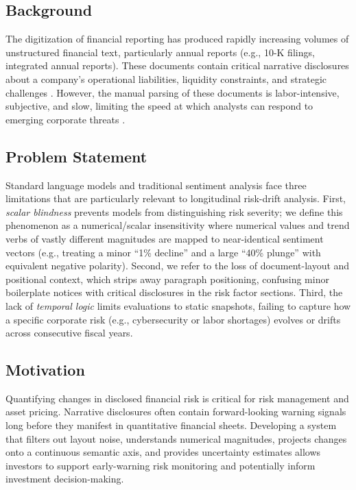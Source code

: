 \documentclass[journal]{IEEEtran}
\begin{document}
\subsection{Background}
The digitization of financial reporting has produced rapidly increasing volumes of unstructured financial text, particularly annual reports (e.g., 10-K filings, integrated annual reports). These documents contain critical narrative disclosures about a company's operational liabilities, liquidity constraints, and strategic challenges \cite{campbell2014, kravet2013, linsley2006}. However, the manual parsing of these documents is labor-intensive, subjective, and slow, limiting the speed at which analysts can respond to emerging corporate threats \cite{blei2003, fisher2016}.

\subsection{Problem Statement}
Standard language models and traditional sentiment analysis face three limitations that are particularly relevant to longitudinal risk-drift analysis. First, \textit{scalar blindness} prevents models from distinguishing risk severity; we define this phenomenon as a numerical/scalar insensitivity where numerical values and trend verbs of vastly different magnitudes are mapped to near-identical sentiment vectors (e.g., treating a minor ``1\% decline'' and a large ``40\% plunge'' with equivalent negative polarity). Second, we refer to the loss of document-layout and positional context, which strips away paragraph positioning, confusing minor boilerplate notices with critical disclosures in the risk factor sections. Third, the lack of \textit{temporal logic} limits evaluations to static snapshots, failing to capture how a specific corporate risk (e.g., cybersecurity or labor shortages) evolves or drifts across consecutive fiscal years.

\subsection{Motivation}
Quantifying changes in disclosed financial risk is critical for risk management and asset pricing. Narrative disclosures often contain forward-looking warning signals long before they manifest in quantitative financial sheets. Developing a system that filters out layout noise, understands numerical magnitudes, projects changes onto a continuous semantic axis, and provides uncertainty estimates allows investors to support early-warning risk monitoring and potentially inform investment decision-making.
\end{document}
